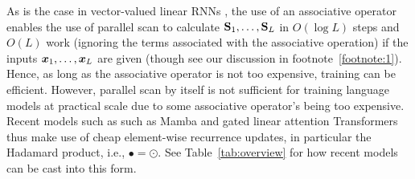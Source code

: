 As is the case in  vector-valued linear RNNs \cite{martin_parallelizing_2018,smith_simplified_2023}, the use of an associative operator enables the use of parallel scan \cite{Blelloch1990PrefixSA} to calculate ${\mathbf{S}}_1, \dots, {\mathbf{S}}_L$ in $O(\log L)$ steps and $O(L)$ work (ignoring the terms associated with the  associative operation)   if the inputs  ${\bm{x}}_1, \dots, {\bm{x}}_L$ are given (though see our discussion in footnote~\ref{footnote:1}). Hence, as long as the associative operator is not too expensive, training can be efficient. 
However,  parallel scan by itself is not sufficient for  training language models at practical scale due to  some associative operator's  being too expensive. Recent models such as such as Mamba \cite{gu_mamba_2023} and gated linear attention Transformers \cite{sun2023retentive,yang_gated_2023,qin_hgrn2_2024,peng_eagle_2024,beck2024xlstm}  thus make use of cheap element-wise recurrence updates, in particular the Hadamard product, i.e., $\bullet = \odot$. 
See Table~\ref{tab:overview} for how recent models can be cast into this form. 




